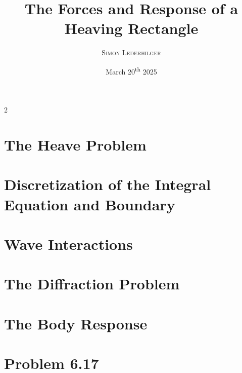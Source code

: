 \documentclass{article}
\title{The Forces and Response of a Heaving Rectangle}
\subtitle{\emph{\headcourse}}
\author{\textsc{Simon Lederhilger}}
\date{March 20\textsuperscript{th} 2025}
\begin{document}
\maketitle\thispagestyle{fancy}
    \begin{multicols*}{2}
        \section[Heave]{The Heave Problem}
        \begingroup\endgroup

        \section[Discretizations]{Discretization of the Integral Equation and Boundary}
        \begingroup\endgroup

        \section[Waves]{Wave Interactions}
        \begingroup\endgroup

        \section[Diffraction]{The Diffraction Problem}
        \begingroup\endgroup

        \section[Response]{The Body Response}
        \begingroup\endgroup
    \end{multicols*}
    
    \section{Problem 6.17}
    \begingroup\endgroup
    \newline\vspace{2mm}
    \begingroup\endgroup
\end{document}

